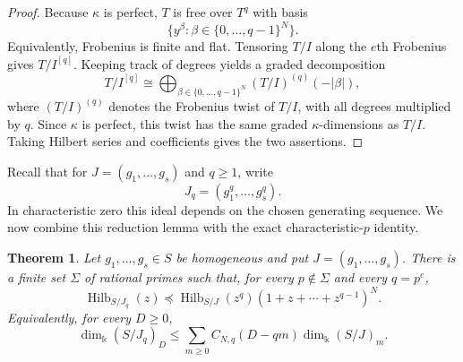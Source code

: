 \documentclass[11pt]{amsart}
\newtheorem{theorem}{Theorem}[section]
\theoremstyle{remark}
\newcommand{\kk}{\Bbbk}
\newcommand{\Hilb}{\operatorname{Hilb}}
\begin{document}
\begin{proof}
Because $\kappa$ is perfect, $T$ is free over $T^q$ with basis
$$
\{y^\beta:\beta\in\{0,\ldots,q-1\}^N\}.
$$
Equivalently, Frobenius is finite and flat. Tensoring $T/I$ along the $e$th Frobenius gives $T/I^{[q]}$. Keeping track of degrees yields a graded decomposition
$$
T/I^{[q]}
\cong
\bigoplus_{\beta\in\{0,\ldots,q-1\}^N}(T/I)^{(q)}(-|\beta|),
$$
where $(T/I)^{(q)}$ denotes the Frobenius twist of $T/I$, with all degrees multiplied by $q$. Since $\kappa$ is perfect, this twist has the same graded $\kappa$-dimensions as $T/I$. Taking Hilbert series and coefficients gives the two assertions.
\end{proof}

Recall that for $J=(g_1,\ldots,g_s)$ and $q\ge1$, write
$$
J_q=(g_1^q,\ldots,g_s^q).
$$
In characteristic zero this ideal depends on the chosen generating sequence. We now combine this reduction lemma with the exact characteristic-$p$ identity. 

\begin{theorem}\label{thm:HF-dilation}
Let $g_1,\ldots,g_s\in S$ be homogeneous and put $J=(g_1,\ldots,g_s)$. There is a finite set $\Sigma$ of rational primes such that, for every $p\notin\Sigma$ and every $q=p^e$,
\begin{equation}\label{eq:HF-dilation}
\Hilb_{S/J_q}(z)
\preceq
\Hilb_{S/J}(z^q)(1+z+\cdots+z^{q-1})^N.
\end{equation}
Equivalently, for every $D\ge0$,
\begin{equation}\label{eq:HF-dilation-coeff}
\dim_{\kk}(S/J_q)_D
\le
\sum_{m\ge0}C_{N,q}(D-qm)\dim_{\kk}(S/J)_m.
\end{equation}
\end{theorem}
\end{document}
